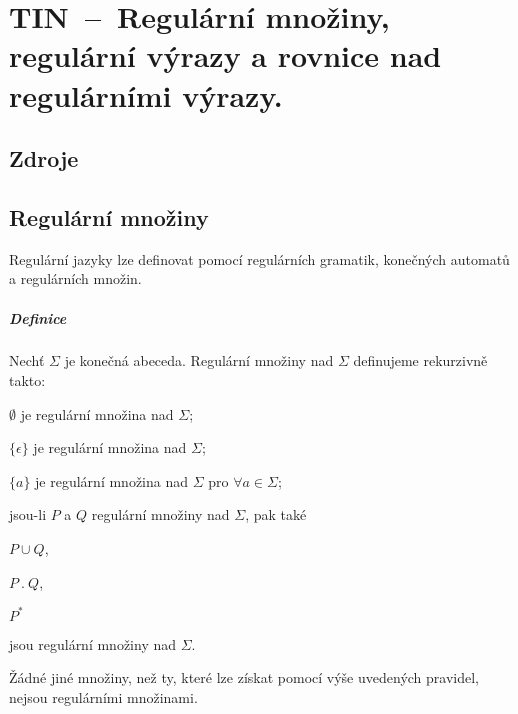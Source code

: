 

\graphicspath{{tin/chomskeho_hierarchie/figures}}


\chapter{TIN~--~Regulární množiny, regulární výrazy a rovnice nad regulárními výrazy.}


\section{Zdroje}

\begin{compactitem}
    \item {}
    \item {}
\end{compactitem}


\section{Regulární množiny}

Regulární jazyky lze definovat pomocí regulárních gramatik, konečných automatů a regulárních množin.

\paragraph*{Definice} Nechť $\Sigma$ je konečná abeceda. Regulární množiny nad $\Sigma$ definujeme rekurzivně takto: \begin{compactitem}
    \item $\emptyset$ je regulární množina nad $\Sigma$;
    \item $\{ \epsilon \}$ je regulární množina nad $\Sigma$;
    \item $\{ a \}$ je regulární množina nad $\Sigma$ pro $\forall a \in \Sigma$;
    \item jsou-li $P$ a $Q$ regulární množiny nad $\Sigma$, pak také \begin{compactitem}
        \item $P \cup Q$,
        \item $P ~.~ Q$,
        \item $P^*$
    \end{compactitem}
    jsou regulární množiny nad $\Sigma$.
    \item Žádné jiné množiny, než ty, které lze získat pomocí výše uvedených pravidel, nejsou regulárními množinami.
\end{compactitem}

